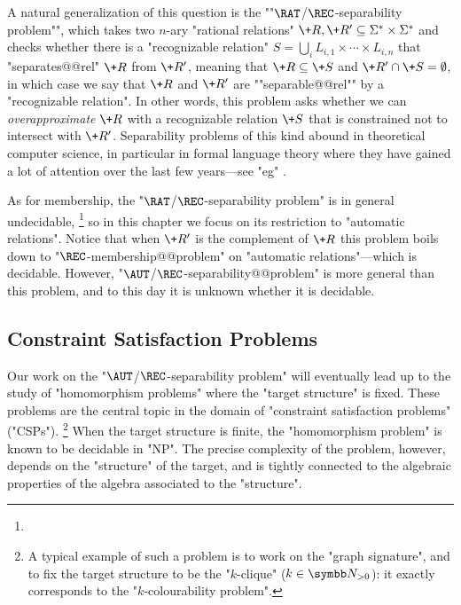 \AP A natural generalization of this question is the
""$\RAT$/$\REC$-separability problem"", which takes two $n$-ary "rational relations" 
$\+R,\+R' \subseteq \Sigma^* \times \Sigma^*$ and checks whether there is a "recognizable relation" 
$S = \bigcup_i L_{i,1} \times \cdots \times L_{i,n}$ that "separates@@rel" $\+R$ from $\+R'$, meaning that $\+R \subseteq \+S$ and $\+R' \cap \+S = \emptyset$, in which case we say that $\+R$
and $\+R'$ are \AP""separable@@rel"" by a "recognizable relation".
In other words, this problem asks whether we can \emph{overapproximate} $\+R$ with a recognizable 
relation $\+S$ that is constrained not to intersect with $\+R'$. Separability problems of this kind abound in theoretical computer science, in particular
in formal language theory where they have gained a lot of attention over the last few years---see "eg" \cite{PlaceZeitoun2016SeparatingRegularLanguages,Kopczynski2016InvisiblePushdownLanguages,CzerwinskiMartensRooijenZeitounZetzsche2017DecidableSeparabilityPiecewiseTestable,ClementeCzerwinskiLasotaPaperman2017RegularSeparabilityParikhAutomata}. 

As for membership, the "$\RAT$/$\REC$-separability problem"
is in general undecidable,%
\footnote{}
so in this chapter we focus on its restriction to
"automatic relations".
Notice that when $\+R'$ is the complement of $\+R$ this problem boils down to "$\REC$-membership@@problem" on "automatic relations"---which is decidable. 
However, "$\AUT$/$\REC$-separability@@problem" is more general than this problem,
and to this day it is unknown whether it is decidable. 


\subsection{Constraint Satisfaction Problems}

Our work on the "$\AUT$/$\REC$-separability problem" will eventually lead up to
the study of "homomorphism problems" where the "target structure" is fixed.
These problems are the central topic in the domain of "constraint satisfaction problems" ("CSPs").%
\footnote{A typical example of such a problem is to work on the "graph signature", and to fix the
target structure to be the "$k$-clique" ($k \in \Np$): it exactly corresponds to
the "$k$-colourability problem".}
When the target structure is finite, the "homomorphism problem" is known to be decidable
in "NP". The precise complexity of the problem, however, depends on the "structure" of the target,
and is tightly connected to the algebraic properties of the algebra associated to the
"structure".

